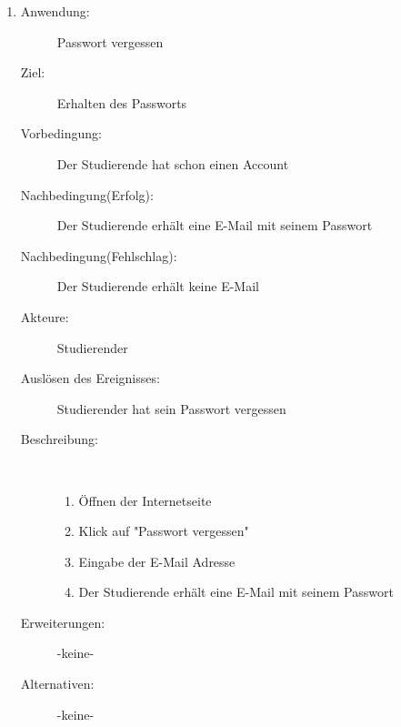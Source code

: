 \documentclass[parskip=full]{scrartcl}
\newcommand{\swtLabel}[1]{\textbf{\textbackslash #1\arabic*0\textbackslash}}
\begin{document}
\begin{enumerate}[label=\swtLabel{S}]
  
  \item
    \begin{description}
  	\item[Anwendung:] Passwort vergessen
  	\item[Ziel:] Erhalten des Passworts
  	\item[Vorbedingung:] Der Studierende hat schon einen Account
  	\item[Nachbedingung(Erfolg):] Der Studierende erhält eine E-Mail mit seinem
  	Passwort
  	\item[Nachbedingung(Fehlschlag):] Der Studierende erhält keine E-Mail
  	\item[Akteure:] Studierender
  	\item[Auslösen des Ereignisses:] Studierender hat sein Passwort vergessen
  	\item[Beschreibung:]~
  	\begin{enumerate}
  	  \item Öffnen der Internetseite
      \item Klick auf "Passwort vergessen"
      \item Eingabe der E-Mail Adresse
      \item Der Studierende erhält eine E-Mail mit seinem Passwort
  	\end{enumerate}
  	\item[Erweiterungen:] -keine-
  	\item[Alternativen:] -keine-
  \end{description}
   
\end{enumerate}
\end{document}
